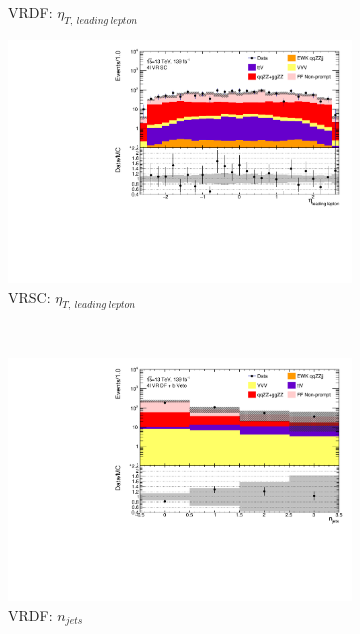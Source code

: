 \begin{figure}[!htb]
\begin{subfigure}{.48\textwidth}
        \caption{VRDF: $\eta_{T,~leading~lepton}$ \label{fig:AllDataMCYield_VRDF_eta1} }
    \end{subfigure}
    \begin{subfigure}{.48\textwidth}
        \centering
        \includegraphics[width = 0.85\linewidth]{figures/Analysis/Background/Overlay_VRSC_FFApplied_eta1.pdf}
        \caption{VRSC: $\eta_{T,~leading~lepton}$ \label{fig:AllDataMCYield_VRSC_eta1} }
    \end{subfigure}\\
    \begin{subfigure}{.48\textwidth}
        \centering
        \includegraphics[width = 0.85\linewidth]{figures/Analysis/Background/Overlay_VRDF_FFApplied_n_jets.pdf}
        \caption{VRDF: $n_{jets}$ \label{fig:AllDataMCYield_VRDF_njet} }
    \end{subfigure}
    \begin{subfigure}{.48\textwidth}
        \centering

\end{subfigure}
\end{figure}
